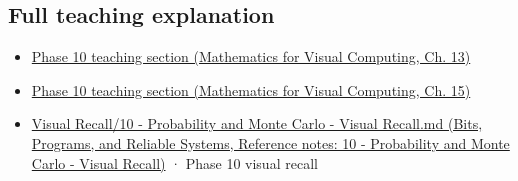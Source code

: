 \subsection{Full teaching explanation}\label{appendix-4192b2bdd21e-full-teaching-explanation}

\begin{itemize}
\tightlist
\item
  \href{../02-Mathematics-for-Visual-Computing/main.pdf\#nameddest=02-foundations-ii-ch029-a-computer-produces-deterministic-pseudorandom-sequences}{Phase 10 teaching section (Mathematics for Visual Computing, Ch. 13)}
\item
  \href{../02-Mathematics-for-Visual-Computing/main.pdf\#nameddest=02-foundations-ii-ch031-use-probability-to-evaluate-graphics-and-research-claims}{Phase 10 teaching section (Mathematics for Visual Computing, Ch. 15)}
\item
  \href{../01-Bits-Programs-and-Reliable-Systems/main.pdf\#nameddest=appendix-cb5af353ef77}{Visual Recall/10 - Probability and Monte Carlo - Visual Recall.md (Bits, Programs, and Reliable Systems, Reference notes: 10 - Probability and Monte Carlo - Visual Recall)} · Phase 10 visual recall
\end{itemize}
